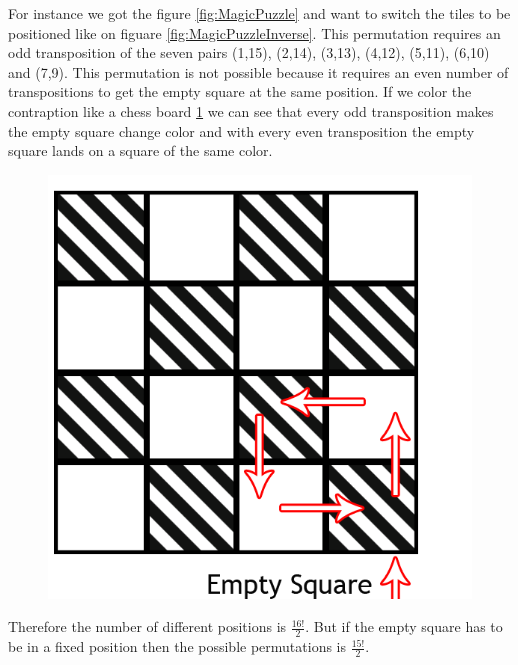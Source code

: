 For instance we got the figure \ref{fig:MagicPuzzle} and want to switch the tiles to be positioned like on figuare \ref{fig:MagicPuzzleInverse}. This permutation requires an odd transposition of the seven pairs (1,15), (2,14), (3,13), (4,12), (5,11), (6,10) and (7,9). This permutation is not possible because it requires an even number of transpositions to get the empty square at the same position. If we color the contraption like a chess board \ref{fig:Chess} we can see that every odd transposition makes the empty square change color and with every even transposition the empty square lands on a square of the same color.

\begin{figure}[!h]
\begin{center}
\includegraphics[scale=0.2]{input/pics/MagicPuzzle(EmptySquare).png}
\caption{}
\label{fig:Chess}
\end{center}
\end{figure}

Therefore the number of different positions is $\frac{16!}{2}$. But if the empty square has to be in a fixed position then the possible permutations is $\frac{15!}{2}$.
